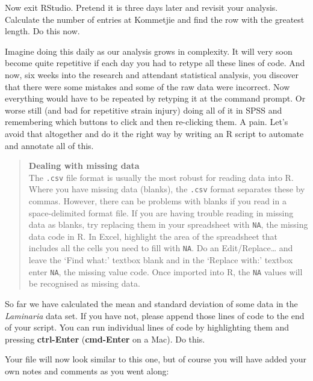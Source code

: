 \documentclass[]{book}
\theoremstyle{definition}
\theoremstyle{definition}
\theoremstyle{definition}
\theoremstyle{remark}
\begin{document}
Now exit RStudio. Pretend it is three days later and revisit your
analysis. Calculate the number of entries at Kommetjie and find the row
with the greatest length. Do this now.

Imagine doing this daily as our analysis grows in complexity. It will
very soon become quite repetitive if each day you had to retype all
these lines of code. And now, six weeks into the research and attendant
statistical analysis, you discover that there were some mistakes and
some of the raw data were incorrect. Now everything would have to be
repeated by retyping it at the command prompt. Or worse still (and bad
for repetitive strain injury) doing all of it in SPSS and remembering
which buttons to click and then re-clicking them. A pain. Let's avoid
that altogether and do it the right way by writing an R script to
automate and annotate all of this.

\begin{quote}
\textbf{Dealing with missing data}\\
The \texttt{.csv} file format is usually the most robust for reading
data into R. Where you have missing data (blanks), the \texttt{.csv}
format separates these by commas. However, there can be problems with
blanks if you read in a space-delimited format file. If you are having
trouble reading in missing data as blanks, try replacing them in your
spreadsheet with \texttt{NA}, the missing data code in R. In Excel,
highlight the area of the spreadsheet that includes all the cells you
need to fill with \texttt{NA}. Do an Edit/Replace\ldots{} and leave the
`Find what:' textbox blank and in the `Replace with:' textbox enter
\texttt{NA}, the missing value code. Once imported into R, the
\texttt{NA} values will be recognised as missing data.
\end{quote}

So far we have calculated the mean and standard deviation of some data
in the \emph{Laminaria} data set. If you have not, please append those
lines of code to the end of your script. You can run individual lines of
code by highlighting them and pressing \textbf{ctrl-Enter}
(\textbf{cmd-Enter} on a Mac). Do this.

Your file will now look similar to this one, but of course you will have
added your own notes and comments as you went along:
\end{document}
